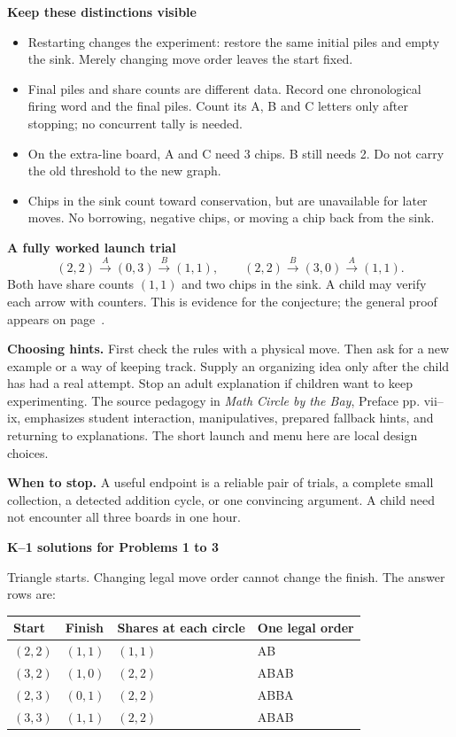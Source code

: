 \documentclass[11pt,letterpaper]{article}
\newcommand{\pagehead}[1]{{\Large\bfseries #1}\par\vspace{3pt}}
\newcommand{\prob}[2]{\par\vspace{5pt}{\large\bfseries #1}\par #2}
\begin{document}
\textbf{Keep these distinctions visible}
\begin{itemize}
\item Restarting changes the experiment: restore the same initial piles and empty the sink. Merely changing move order leaves the start fixed.
\item Final piles and share counts are different data. Record one chronological firing word and the final piles. Count its A, B and C letters only after stopping; no concurrent tally is needed.
\item On the extra-line board, A and C need 3 chips. B still needs 2. Do not carry the old threshold to the new graph.
\item Chips in the sink count toward conservation, but are unavailable for later moves. No borrowing, negative chips, or moving a chip back from the sink.
\end{itemize}
\textbf{A fully worked launch trial}
\[
(2,2)\xrightarrow{A}(0,3)\xrightarrow{B}(1,1),
\qquad
(2,2)\xrightarrow{B}(3,0)\xrightarrow{A}(1,1).
\]
Both have share counts $(1,1)$ and two chips in the sink. A child may verify each arrow with counters. This is evidence for the conjecture; the general proof appears on page~\pageref{theorem}.

\textbf{Choosing hints.} First check the rules with a physical move. Then ask for a new example or a way of keeping track. Supply an organizing idea only after the child has had a real attempt. Stop an adult explanation if children want to keep experimenting. The source pedagogy in \emph{Math Circle by the Bay}, Preface pp. vii--ix, emphasizes student interaction, manipulatives, prepared fallback hints, and returning to explanations. The short launch and menu here are local design choices.

\textbf{When to stop.} A useful endpoint is a reliable pair of trials, a complete small collection, a detected addition cycle, or one convincing argument. A child need not encounter all three boards in one hour.

\newpage
\pagehead{K--1 solutions for Problems 1 to 3}
\prob{Problem 1}{Triangle starts. Changing legal move order cannot change the finish. The answer rows are:}
\begin{center}\begin{tabular}{llll}\toprule Start & Finish & Shares at each circle & One legal order\\\midrule
$(2,2)$ & $(1,1)$ & $(1,1)$ & AB\\
$(3,2)$ & $(1,0)$ & $(2,2)$ & ABAB\\
$(2,3)$ & $(0,1)$ & $(2,2)$ & ABBA\\
$(3,3)$ & $(1,1)$ & $(2,2)$ & ABAB\\
\bottomrule\end{tabular}\end{center}
\end{document}
